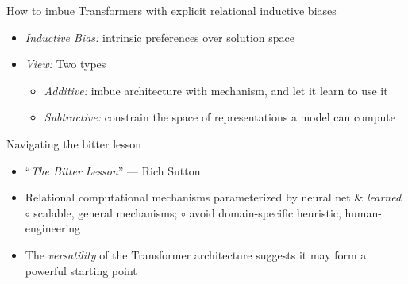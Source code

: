 \documentclass[xcolor={dvipsnames}]{beamer}
\begin{document}
\begin{frame}{How to imbue Transformers with explicit relational inductive biases}
    \begin{itemize}
        \item \alert{\emph{Inductive Bias:}} intrinsic preferences over solution space
        \item \alert{\emph{View:}} Two types
        \begin{itemize}
            \item \emph{Additive:} imbue architecture with mechanism, and let it learn to use it
            \item \emph{Subtractive:} constrain the space of representations a model can compute
        \end{itemize}
    \end{itemize}
\end{frame}

\begin{frame}{Navigating the bitter lesson}
    \begin{itemize}
        \item ``\alert{\emph{The Bitter Lesson}}'' --- Rich Sutton
        \item Relational computational mechanisms \alert{parameterized by neural net \& \emph{learned}} \newline
        \hphantom{~~} $\circ$ scalable, general mechanisms; \newline
        \hphantom{~~} $\circ$ avoid domain-specific heuristic, human-engineering
        \item The \emph{versatility} of the \alert{Transformer architecture} suggests it may form a powerful starting point
    \end{itemize}
\end{frame}
\end{document}
